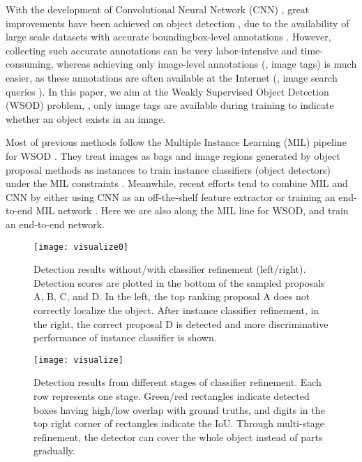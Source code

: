 \documentclass[10pt,twocolumn,letterpaper]{article}
\begin{document}
With the development of Convolutional Neural Network (CNN) \cite{Ref:Krizhevsky2012,Ref:Lecun1998}, great improvements have been achieved on object detection \cite{Ref:Girshick2015,Ref:Girshick2016,Ref:Liu2016,Ref:Redmon2016,Ref:Ren2015}, due to the availability of large scale datasets with accurate boundingbox-level annotations \cite{Ref:Deng2009,Ref:Everingham2010,Ref:Lin2014}.
However, collecting such accurate annotations can be very labor-intensive and time-consuming, whereas achieving only image-level annotations (\ie, image tags) is much easier, as these annotations are often available at the Internet (\eg, image search queries \cite{Ref:Li2013}).
In this paper, we aim at the Weakly Supervised Object Detection (WSOD) problem, \ie, only image tags are available during training to indicate whether an object exists in an image.

Most of previous methods follow the Multiple Instance Learning (MIL) pipeline for WSOD \cite{Ref:Bilen2015,Ref:Bilen2016,Ref:Cibis2017,Ref:Kantorov2016,Ref:Song2014,Ref:Wang2014,Ref:Wang2015}.
They treat images as bags and image regions generated by object proposal methods \cite{Ref:Uijlings2013,Ref:Zitnick2014} as instances to train instance classifiers (object detectors) under the MIL constraints \cite{Ref:Dietterich1997}. %
Meanwhile, recent efforts tend to combine MIL and CNN by either using CNN as an off-the-shelf feature extractor \cite{Ref:Bilen2015,Ref:Cibis2017,Ref:Song2014,Ref:Wang2014,Ref:Wang2015} or training an end-to-end MIL network \cite{Ref:Bilen2016,Ref:Kantorov2016}.
Here we are also along the MIL line for WSOD, and train an end-to-end network.

\begin{figure}[t]
\begin{center}
   \texttt{[image: visualize0]}
\end{center}
   \caption{Detection results without/with classifier refinement (left/right).
   Detection scores are plotted in the bottom of the sampled proposals A, B, C, and D.
   In the left, the top ranking proposal A does not correctly localize the object.
   After instance classifier refinement, in the right, the correct proposal D is detected and more discriminative performance of instance classifier is shown.}
\label{fig:visualize0}
\end{figure}

\begin{figure*}[t]
\begin{center}
   \texttt{[image: visualize]}
\end{center}
   \caption{Detection results from different stages of classifier refinement.
   Each row represents one stage.
   Green/red rectangles indicate detected boxes having high/low overlap with ground truths, and digits in the top right corner of rectangles indicate the IoU.
   Through multi-stage refinement, the detector can cover the whole object instead of parts gradually.}
\label{fig:visualize}
\end{figure*}
\end{document}
